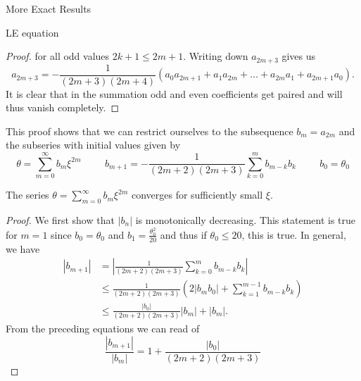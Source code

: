 \begin{section}{More Exact Results}
\begin{subsection}{LE equation}
\begin{proof}
	for all odd values $2k+1\leq2m+1$. Writing down $a_{2m+3}$ gives us
	\begin{equation}
		a_{2m+3} = -\frac{1}{(2m+3)(2m+4)}\left(a_0a_{2m+1}+a_1a_{2m}+\dots+a_{2m}a_1+a_{2m+1}a_0\right).
	\end{equation}
	It is clear that in the summation odd and even coefficients get paired and will thus 
	vanish completely.
\end{proof}\noindent
This proof shows that we can restrict ourselves to the subsequence $b_m=a_{2m}$ and 
the subseries with initial values given by
\begin{equation}
	\theta = \sum\limits_{m=0}^\infty b_m\xi^{2m} \hspace{1cm} b_{m+1} = 
	-\frac{1}{(2m+2)(2m+3)}\sum\limits_{k=0}^mb_{m-k}b_k \hspace{1cm} b_0=\theta_0
\end{equation}
\begin{theorem}
	The series $\theta=\sum\limits_{m=0}^\infty b_m\xi^{2m}$ converges for sufficiently small $\xi$.
\end{theorem}
\begin{proof}
	We first show that $|b_n|$ is monotonically decreasing. 
	This statement is true for $m=1$ since $b_0=\theta_0$ and $b_1=\frac{\theta_0^2}{20}$
	and thus if $\theta_0\leq20$, this is true. In general, we have
	\begin{align}
		|b_{m+1}| &= \left|\frac{1}{(2m+2)(2m+3)}\sum\limits_{k=0}^m b_{m-k}b_k\right|\\
		&\leq \frac{1}{(2m+2)(2m+3)}\left(2|b_mb_0| + \sum\limits_{k=1}^{m-1}b_{m-k}b_k\right)\\
		&\leq \frac{|b_0|}{(2m+2)(2m+3)}|b_m| + |b_m|.
	\end{align}
	From the preceding equations we can read of
	\begin{equation}
		\frac{|b_{m+1}|}{|b_m|} = 1+\frac{|b_0|}{(2m+2)(2m+3)}
	\end{equation}


\end{proof}
\end{subsection}
\end{section}
